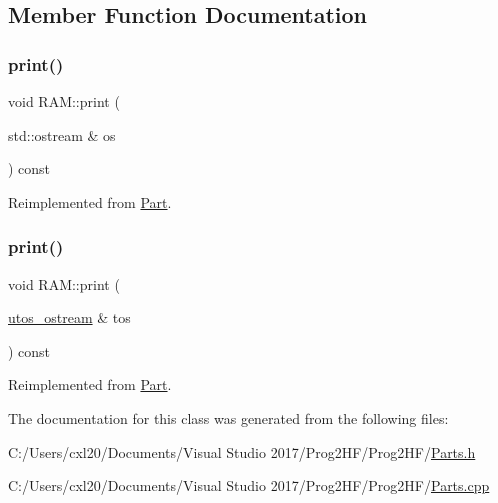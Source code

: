 \subsection{Member Function Documentation}
\mbox{\label{class_r_a_m_a2f226659cbc23f841d73525572ba9574}} 
\subsubsection{\texorpdfstring{print()}{print()}\hspace{0.1cm}{\footnotesize\ttfamily [1/2]}}
{\footnotesize\ttfamily void R\+A\+M\+::print (\begin{DoxyParamCaption}\item[{std\+::ostream \&}]{os }\end{DoxyParamCaption}) const\hspace{0.3cm}{\ttfamily [virtual]}}



Reimplemented from \mbox{\hyperlink{class_part_a4fa402b8e8fd4236ff773a7697ab2bc3}{Part}}.

\mbox{\label{class_r_a_m_a11a874dd6cf99454efd6b7a1d20a3737}} 
\subsubsection{\texorpdfstring{print()}{print()}\hspace{0.1cm}{\footnotesize\ttfamily [2/2]}}
{\footnotesize\ttfamily void R\+A\+M\+::print (\begin{DoxyParamCaption}\item[{\mbox{\hyperlink{structutos__ostream}{utos\+\_\+ostream}} \&}]{tos }\end{DoxyParamCaption}) const\hspace{0.3cm}{\ttfamily [virtual]}}



Reimplemented from \mbox{\hyperlink{class_part_a9ecabe44ba3415badf82c6a23617a41e}{Part}}.



The documentation for this class was generated from the following files\+:\begin{DoxyCompactItemize}
\item 
C\+:/\+Users/cxl20/\+Documents/\+Visual Studio 2017/\+Prog2\+H\+F/\+Prog2\+H\+F/\mbox{\hyperlink{_parts_8h}{Parts.\+h}}\item 
C\+:/\+Users/cxl20/\+Documents/\+Visual Studio 2017/\+Prog2\+H\+F/\+Prog2\+H\+F/\mbox{\hyperlink{_parts_8cpp}{Parts.\+cpp}}\end{DoxyCompactItemize}
